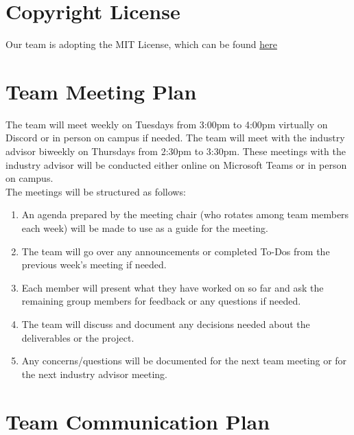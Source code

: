 \documentclass{article}
\begin{document}
\section{Copyright License}

Our team is adopting the MIT License, which can be found \href{https://github.com/4G06-CAPSTONE-2025/Reading4All/blob/main/LICENSE} {here}

\section{Team Meeting Plan}

The team will meet weekly on Tuesdays from 3:00pm to 4:00pm virtually on Discord or in person on campus if needed. 
The team will meet with the industry advisor biweekly on Thursdays from 2:30pm to 3:30pm. These meetings with the industry advisor will 
be conducted either online on Microsoft Teams or in person on campus. \\[1ex]
The meetings will be structured as follows: 
\begin{enumerate}
	\item An agenda prepared by the meeting chair (who rotates among team members each week) 
  will be made to use as a guide for the meeting.
	\item The team will go over any announcements or completed To-Dos from the previous week's 
  meeting if needed.
  \item Each member will present what they have worked on so far and ask the remaining group 
  members for feedback or any questions if needed.
  \item The team will discuss and document any decisions needed about the deliverables 
  or the project. 
  \item Any concerns/questions will be documented for the next team meeting or for the next 
  industry advisor meeting.
\end{enumerate}

\section{Team Communication Plan}
\end{document}
